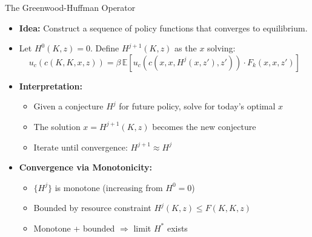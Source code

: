\begin{frame}{The Greenwood-Huffman Operator}
\begin{itemize}
\item \textbf{Idea:} Construct a sequence of policy functions that converges to equilibrium.

\medskip
\item Let $H^{0}(K,z) = 0$. Define $H^{j+1}(K,z)$ as the $x$ solving:
\[
u_c(c(K,K,x,z)) = \beta \, \mathbb{E} \left[ u_c(c(x,x,H^{j}(x,z'),z')) \cdot F_k(x,x,z') \right]
\]

\medskip
\item \textbf{Interpretation:}
\begin{itemize}
    \item Given a conjecture $H^j$ for future policy, solve for today's optimal $x$
    \item The solution $x = H^{j+1}(K,z)$ becomes the new conjecture
    \item Iterate until convergence: $H^{j+1} \approx H^j$
\end{itemize}

\medskip
\item \textbf{Convergence via Monotonicity:}
\begin{itemize}
    \item $\{H^j\}$ is monotone (increasing from $H^0 = 0$)
    \item Bounded by resource constraint $H^j(K,z) \leq F(K,K,z)$
    \item Monotone + bounded $\Rightarrow$ limit $H^*$ exists
\end{itemize}
\end{itemize}
\end{frame}

